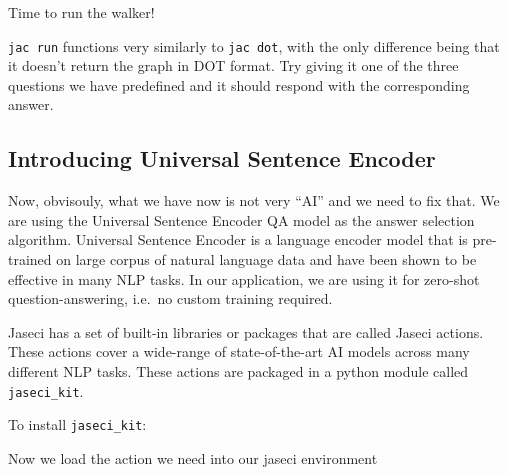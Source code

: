 Time to run the walker!

\begin{Shaded}
    \begin{Highlighting}[]
         \OperatorTok{>}
    \end{Highlighting}
\end{Shaded}

\texttt{jac\ run} functions very similarly to \texttt{jac\ dot}, with
the only difference being that it doesn't return the graph in DOT
format. Try giving it one of the three questions we have predefined and
it should respond with the corresponding answer.

\subsection{Introducing Universal Sentence
    Encoder}\label{introducing-universal-sentence-encoder}

Now, obvisouly, what we have now is not very ``AI'' and we need to fix
that. We are using the Universal Sentence Encoder QA model as the answer
selection algorithm. Universal Sentence Encoder is a language encoder
model that is pre-trained on large corpus of natural language data and
have been shown to be effective in many NLP tasks. In our application,
we are using it for zero-shot question-answering, i.e.~no custom
training required.

Jaseci has a set of built-in libraries or packages that are called
Jaseci actions. These actions cover a wide-range of state-of-the-art AI
models across many different NLP tasks. These actions are packaged in a
python module called \texttt{jaseci\_kit}.

To install \texttt{jaseci\_kit}:

\begin{Shaded}
    \begin{Highlighting}[]
    \end{Highlighting}
\end{Shaded}

Now we load the action we need into our jaseci environment

\begin{Shaded}
    \begin{Highlighting}[]
         \OperatorTok{>}
    \end{Highlighting}
\end{Shaded}

